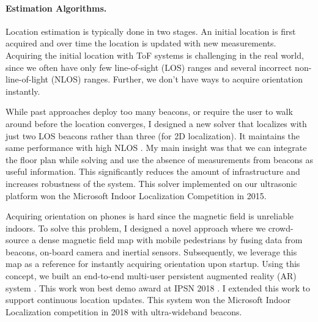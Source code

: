 \documentclass[10pt]{article}
\begin{document}
\paragraph{Estimation Algorithms. } 
Location estimation is typically done in two stages. An initial location is first acquired and over time the location is updated with new measurements. 
Acquiring the initial location with ToF systems is challenging in the real world, since we often have only few line-of-sight (LOS) ranges and several incorrect non-line-of-light (NLOS) ranges. Further, we don't have ways to acquire orientation instantly. 

While past approaches deploy too many beacons, or require the user to walk around before the location converges, I designed a new solver that localizes with just two LOS beacons rather than three (for 2D localization). It maintains the same performance with high NLOS \cite{rajagopal2018enhancing}.  %
My main insight was that we can integrate the floor plan while solving and use the absence of measurements from beacons as useful information. 
This significantly reduces the amount of infrastructure and increases robustness of the system. 
This solver implemented on our ultrasonic platform won the Microsoft Indoor Localization Competition in 2015. %

Acquiring orientation on phones is hard since the magnetic field is unreliable indoors. To solve this problem, 
I designed a novel approach %
where we %
crowd-source a dense magnetic field map with mobile pedestrians by fusing data from beacons, on-board camera and inertial sensors. 
Subsequently, we leverage this map as a reference for instantly acquiring orientation upon startup. %
Using this concept, we built an end-to-end multi-user persistent augmented reality (AR) system \cite{mobileAR}. This work won best demo award at IPSN 2018 \cite{rajagopal2018welcome}. I extended this work to support continuous location updates. This system won the Microsoft Indoor Localization competition in 2018 with ultra-wideband beacons. 
\end{document}

